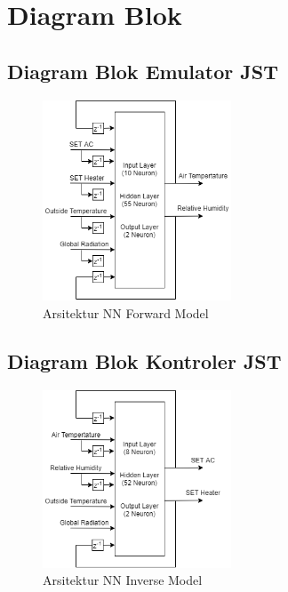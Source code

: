 \chapter{Diagram Blok}

\section{Diagram Blok Emulator JST}

\begin{figure}[!h]
	\centering
	\includegraphics[width=0.5\textwidth]{figures/NNForwardModelDesign}
	\caption{Arsitektur NN Forward Model}
	\label{fig:C:NNForwardModelDesign}
\end{figure}
\vspace{-1em}

\section{Diagram Blok Kontroler JST}

\begin{figure}[!h]
	\centering
	\includegraphics[width=0.5\textwidth]{figures/NNInverseModelDesign}
	\caption{Arsitektur NN Inverse Model}
	\label{fig:C:NNInverseModelDesign}
\end{figure}

